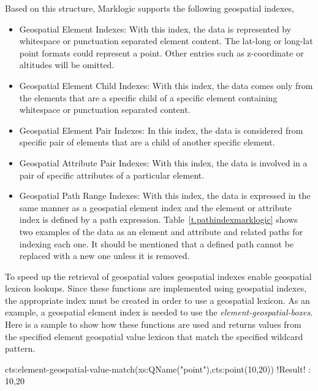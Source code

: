 \documentclass[a4paper,12pt]{article}
\begin{document}
Based on this structure, Marklogic supports the following geospatial indexes,
\begin{itemize}
\item Geospatial Element Indexes: With this index, the data is represented by whitespace or punctuation separated element content. The lat-long or long-lat point formats could represent a point. Other entries such as z-coordinate or altitudes will be omitted.
\item Geospatial Element Child Indexes: With this index, the data comes only from the elements that are a specific child of a specific element containing whitespace or punctuation separated content.
\item Geospatial Element Pair Indexes: In this index, the data is considered from specific pair of elements that are a child of another specific element.
\item Geospatial Attribute Pair Indexes: With this index, the data is involved in a pair of specific attributes of a particular element.
\item Geospatial Path Range Indexes: With this index, the data is expressed in the same manner as a geospatial element index and the element or attribute index is defined by a path expression. Table~\ref{t.pathindexmarklogic} shows two examples of the data as an element and attribute and related paths for indexing each one. It should be mentioned that a defined path cannot be replaced with a new one unless it is removed.
\end{itemize}

To speed up the retrieval of geospatial values geospatial indexes enable geospatial lexicon lookups. Since these functions are implemented using geospatial indexes, the appropriate index must be created in order to use a geospatial lexicon. As an example, a geospatial element index is needed to use the \textit{element-geospatial-boxes}. Here is a sample to show how these functions are used and returns values from the specified element geospatial value lexicon that match the specified wildcard pattern.
\vspace{10px}
\begin{fakeJSON}[escapechar=\!]
cts:element-geospatial-value-match(xs:QName("point"),cts:point(10,20))
 !\colorbox{light-gray}{Result}! : 10,20
\end{fakeJSON}
\vspace{10px}

\end{document}
